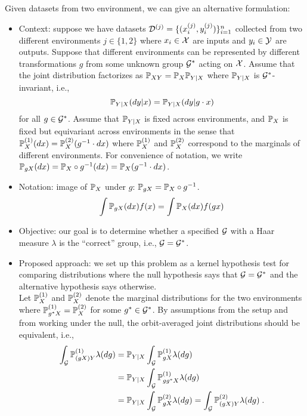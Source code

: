 Given datasets from two environment, we can give an alternative formulation:

\begin{itemize}

\item
Context: suppose we have datasets $\calD^{(j)}=\{(x_i^{(j)},y_i^{(j)})\}_{i=1}^n$ collected from two different environments $j\in\{1,2\}$ where $x_i\in\calX$ are inputs and $y_i\in\calY$ are outputs. Suppose that different environments can be represented by different transformations $g$ from some unknown group $\calG^*$ acting on $\calX$. Assume that the joint distribution factorizes as $\bbP_{XY}=\bbP_X\bbP_{Y|X}$ where $\bbP_{Y|X}$ is $\calG^*$-invariant, i.e.,
\[
\bbP_{Y|X}(dy|x) = \bbP_{Y|X}(dy|g\cdot x)
\]
for all $g\in\calG^*$. Assume that $\bbP_{Y|X}$ is fixed across environments, and $\bbP_X$ is fixed but equivariant across environments in the sense that $\bbP_X^{(1)}(dx)=\bbP_X^{(2)}(g^{-1}\cdot dx)$ where $\bbP_X^{(1)}$ and $\bbP_X^{(2)}$ correspond to the marginals of different environments. For convenience of notation, we write $\bbP_{gX}(dx)=\P_X\circ g^{-1}(dx) = \bbP_X(g^{-1}\cdot dx)$.

\item
Notation: image of $\P_X$ under $g$: $\P_{gX} = \P_{X} \circ g^{-1}$.
\[
\int \P_{gX}(dx) f(x) = \int \P_X(dx) f(gx)
\]

\item
Objective: our goal is to determine whether a specified $\calG$ with a Haar measure $\lambda$ is the ``correct'' group, i.e., $\calG=\calG^*$.

\item
Proposed approach: we set up this problem as a kernel hypothesis test for comparing distributions where the null hypothesis says that $\calG=\calG^*$ and the alternative hypothesis says otherwise.
\\

Let $\bbP_X^{(1)}$ and $\bbP_X^{(2)}$ denote the marginal distributions for the two environments where $\bbP_{g^*X}^{(1)}=\bbP_X^{(2)}$ for some $g^*\in\calG^*$. By assumptions from the setup and from working under the null, the orbit-averaged joint distributions should be equivalent, i.e.,
\begin{align*}
\int_{\calG}\bbP_{(gX)Y}^{(1)}\lambda(dg) &=
\bbP_{Y|X}\int_{\calG}\bbP_{gX}^{(1)}\lambda(dg) \\
&= \bbP_{Y|X}\int_{\calG}\bbP_{gg^*X}^{(1)}\lambda(dg) \\
&= \bbP_{Y|X}\int_{\calG}\bbP_{gX}^{(2)}\lambda(dg) = \int_{\calG}\bbP_{(gX)Y}^{(2)}\lambda(dg) \;.
\end{align*}


\end{itemize}
